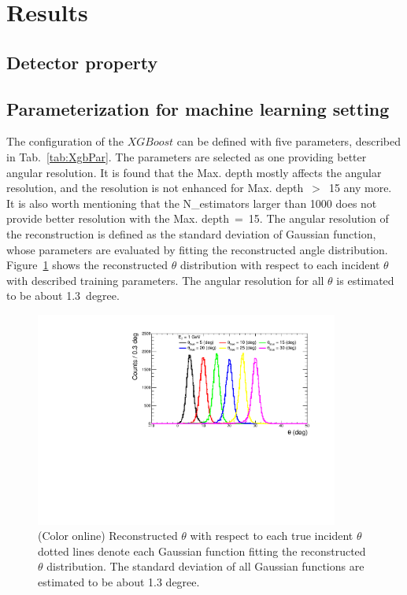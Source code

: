 \documentclass[jkps,preprint,fleqn,showpacs,showkeys]{revtex4}
\newcommand{\XGB}{XGBoost}
\begin{document}
\section{Results}
\label{sec:res}

\subsection{Detector property}

\subsection{Parameterization for machine learning setting}
The configuration of the $\XGB$ can be defined with five parameters, described in Tab.~\ref{tab:XgbPar}. The parameters are selected as one providing better angular resolution. It is found that the Max. depth mostly affects the angular resolution, and the resolution is not enhanced for Max. depth~$>$~15 any more. It is also worth mentioning that the N\_estimators larger than 1000 does not provide better resolution with the Max. depth~=~15. The angular resolution of the reconstruction is defined as the standard deviation of Gaussian function, whose parameters are evaluated by fitting the reconstructed angle distribution. Figure~\ref{fig:angle_reco_def} shows the reconstructed $\theta$ distribution with respect to each incident $\theta$ with described training parameters. The angular resolution for all $\theta$ is estimated to be about 1.3~degree.

\begin{figure}[!hbt]
\includegraphics[width=0.89\textwidth]{figures/Fig1_reco_def.pdf}
\caption{ (Color online) Reconstructed $\theta$ with respect to each true incident $\theta$ dotted lines denote each Gaussian function fitting the reconstructed $\theta$ distribution. The standard deviation of all Gaussian functions are estimated to be about 1.3 degree.}
\label{fig:angle_reco_def}
\end{figure}
\end{document}
